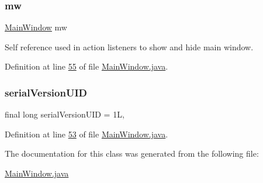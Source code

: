 \subsubsection{\texorpdfstring{mw}{mw}}
{\footnotesize\ttfamily \hyperlink{classgui_1_1_main_window}{Main\+Window} mw\hspace{0.3cm}{\ttfamily [private]}}



Self reference used in action listeners to show and hide main window. 



Definition at line \hyperlink{_main_window_8java_source_l00055}{55} of file \hyperlink{_main_window_8java_source}{Main\+Window.\+java}.

\hypertarget{classgui_1_1_main_window_a3238d314ecdee14d2966760945d00c3b}{}\label{classgui_1_1_main_window_a3238d314ecdee14d2966760945d00c3b} 
\subsubsection{\texorpdfstring{serial\+Version\+U\+ID}{serialVersionUID}}
{\footnotesize\ttfamily final long serial\+Version\+U\+ID = 1L\hspace{0.3cm}{\ttfamily [static]}, {\ttfamily [private]}}



Definition at line \hyperlink{_main_window_8java_source_l00053}{53} of file \hyperlink{_main_window_8java_source}{Main\+Window.\+java}.



The documentation for this class was generated from the following file\+:\begin{DoxyCompactItemize}
\item 
\hyperlink{_main_window_8java}{Main\+Window.\+java}\end{DoxyCompactItemize}

